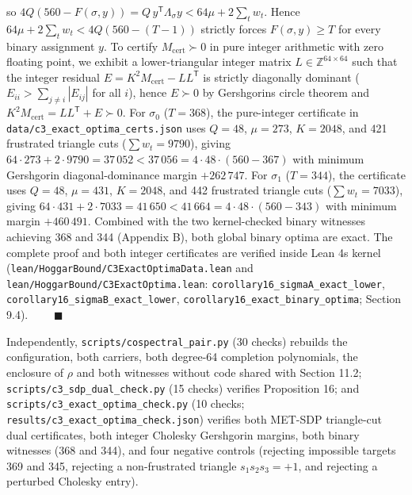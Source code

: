 \documentclass[11pt,a4paper]{article}
\newcommand{\lt}{<}
\newcommand{\gt}{>}
\begin{document}
so \(4 Q (560 - F(\sigma, y)) = Q\,y^{\mathsf T} \Lambda_\sigma y \lt 64\mu + 2 \sum_t w_t\). Hence
\(64\mu + 2 \sum_t w_t \lt 4 Q (560 - (T - 1))\) strictly forces \(F(\sigma, y) \ge T\) for every binary
assignment \(y\). To certify \(M_{\mathrm{cert}} \succ 0\) in pure integer arithmetic with zero floating
point, we exhibit a lower-triangular integer matrix \(L \in \mathbb{Z}^{64 \times 64}\) such that the
integer residual \(E = K^2 M_{\mathrm{cert}} - L L^{\mathsf T}\) is strictly diagonally dominant
(\(E_{ii} \gt \sum_{j \ne i} |E_{ij}|\) for all \(i\)), hence \(E \succ 0\) by Gershgorin\textquotesingle s circle theorem and
\(K^2 M_{\mathrm{cert}} = L L^{\mathsf T} + E \succ 0\).
For \(\sigma_0\) (\(T = 368\)), the pure-integer certificate in \nolinkurl{data/c3_exact_optima_certs.json} uses
\(Q = 48\), \(\mu = 273\), \(K = 2048\), and 421 frustrated triangle cuts (\(\sum w_t = 9790\)), giving
\(64 \cdot 273 + 2 \cdot 9790 = 37\,052 \lt 37\,056 = 4 \cdot 48 \cdot (560 - 367)\) with minimum Gershgorin
diagonal-dominance margin \(+262\,747\). For \(\sigma_1\) (\(T = 344\)), the certificate uses \(Q = 48\),
\(\mu = 431\), \(K = 2048\), and 442 frustrated triangle cuts (\(\sum w_t = 7033\)), giving
\(64 \cdot 431 + 2 \cdot 7033 = 41\,650 \lt 41\,664 = 4 \cdot 48 \cdot (560 - 343)\) with minimum margin
\(+460\,491\). Combined with the two kernel-checked binary witnesses achieving 368 and 344 (Appendix B),
both global binary optima are exact. The complete proof and both integer certificates are verified inside
Lean 4\textquotesingle s kernel (\nolinkurl{lean/HoggarBound/C3ExactOptimaData.lean} and \nolinkurl{lean/HoggarBound/C3ExactOptima.lean}:
\nolinkurl{corollary16_sigmaA_exact_lower}, \nolinkurl{corollary16_sigmaB_exact_lower}, \nolinkurl{corollary16_exact_binary_optima};
Section 9.4). \(\qquad\blacksquare\)

Independently, \nolinkurl{scripts/cospectral_pair.py} (30 checks) rebuilds the configuration, both carriers, both
degree-64 completion polynomials, the enclosure of \(\rho\) and both witnesses without code shared with
Section 11.2; \nolinkurl{scripts/c3_sdp_dual_check.py} (15 checks) verifies Proposition 16\textquotesingle; and
\nolinkurl{scripts/c3_exact_optima_check.py} (10 checks; \nolinkurl{results/c3_exact_optima_check.json}) verifies both
MET-SDP triangle-cut dual certificates, both integer Cholesky Gershgorin margins, both binary witnesses
(368 and 344), and four negative controls (rejecting impossible targets 369 and 345, rejecting a
non-frustrated triangle \(s_1 s_2 s_3 = +1\), and rejecting a perturbed Cholesky entry).
\end{document}
